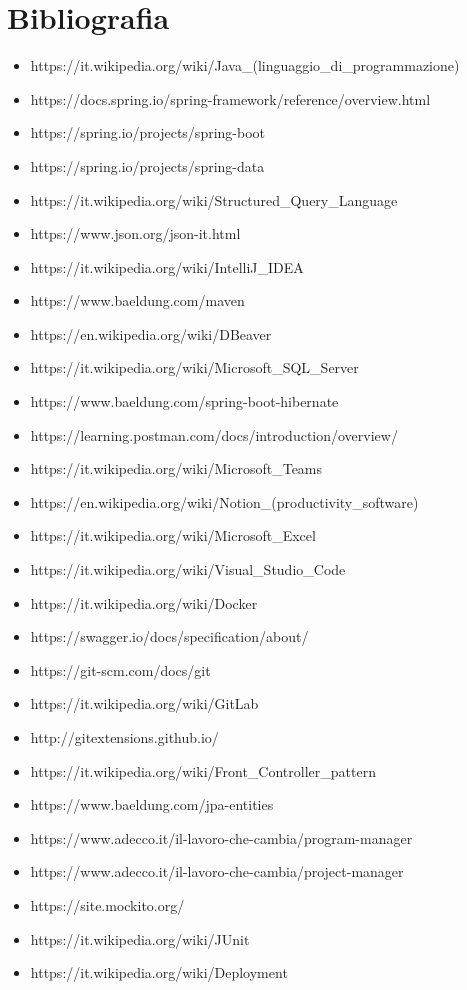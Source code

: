 \cleardoublepage
\chapter{Bibliografia}

\nocite{*}

\printbibliography[heading=subbibliography,title={Riferimenti bibliografici},type=book]

\printbibliography[heading=subbibliography,title={Siti web consultati},type=online]

\begin{itemize}
\item https://it.wikipedia.org/wiki/Java\_(linguaggio\_di\_programmazione)
\item https://docs.spring.io/spring-framework/reference/overview.html
\item https://spring.io/projects/spring-boot
\item https://spring.io/projects/spring-data
\item https://it.wikipedia.org/wiki/Structured\_Query\_Language
\item https://www.json.org/json-it.html
\item https://it.wikipedia.org/wiki/IntelliJ\_IDEA
\item https://www.baeldung.com/maven
\item https://en.wikipedia.org/wiki/DBeaver
\item https://it.wikipedia.org/wiki/Microsoft\_SQL\_Server
\item https://www.baeldung.com/spring-boot-hibernate
\item https://learning.postman.com/docs/introduction/overview/
\item https://it.wikipedia.org/wiki/Microsoft\_Teams
\item https://en.wikipedia.org/wiki/Notion\_(productivity\_software)
\item https://it.wikipedia.org/wiki/Microsoft\_Excel
\item https://it.wikipedia.org/wiki/Visual\_Studio\_Code
\item https://it.wikipedia.org/wiki/Docker
\item https://swagger.io/docs/specification/about/
\item https://git-scm.com/docs/git
\item https://it.wikipedia.org/wiki/GitLab
\item http://gitextensions.github.io/
\item https://it.wikipedia.org/wiki/Front\_Controller\_pattern
\item https://www.baeldung.com/jpa-entities
\item https://www.adecco.it/il-lavoro-che-cambia/program-manager
\item https://www.adecco.it/il-lavoro-che-cambia/project-manager
\item https://site.mockito.org/
\item https://it.wikipedia.org/wiki/JUnit
\item https://it.wikipedia.org/wiki/Deployment

\end{itemize}